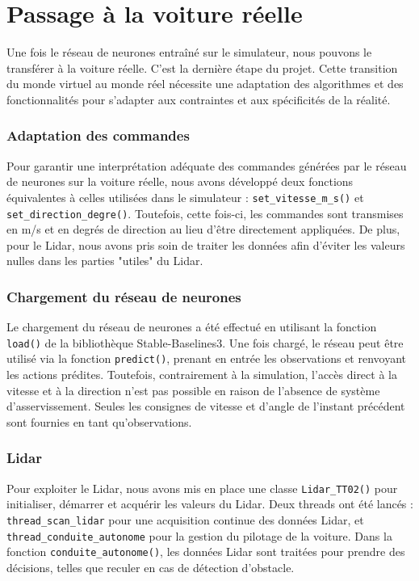\documentclass[french]{article}
\begin{document}
\section*{Passage à la voiture réelle}
Une fois le réseau de neurones entraîné sur le simulateur, nous pouvons le transférer à la voiture réelle. C'est 
la dernière étape du projet. Cette transition du monde virtuel au monde réel nécessite une adaptation des algorithmes 
et des fonctionnalités pour s'adapter aux contraintes et aux spécificités de la réalité.

\subsubsection*{Adaptation des commandes}
Pour garantir une interprétation adéquate des commandes générées par le réseau de neurones sur la voiture réelle,
nous avons développé deux fonctions équivalentes à celles utilisées dans le simulateur : \texttt{set\_vitesse\_m\_s()} 
et \texttt{set\_direction\_degre()}. Toutefois, cette fois-ci, les commandes sont transmises en m/s et en degrés de 
direction au lieu d'être directement appliquées. De plus, pour le Lidar, nous avons pris soin de traiter les données 
afin d'éviter les valeurs nulles dans les parties "utiles" du Lidar.


\subsubsection*{Chargement du réseau de neurones}
Le chargement du réseau de neurones a été effectué en utilisant la fonction \texttt{load()} de la bibliothèque 
Stable-Baselines3. Une fois chargé, le réseau peut être utilisé via la fonction \texttt{predict()}, prenant en 
entrée les observations et renvoyant les actions prédites. Toutefois, contrairement à la simulation, l'accès direct 
à la vitesse et à la direction n'est pas possible en raison de l'absence de système d'asservissement. Seules les 
consignes de vitesse et d'angle de l'instant précédent sont fournies en tant qu'observations.

\subsubsection*{Lidar}
Pour exploiter le Lidar, nous avons mis en place une classe \texttt{Lidar\_TT02()} pour initialiser, démarrer 
et acquérir les valeurs du Lidar. Deux threads ont été lancés : \texttt{thread\_scan\_lidar} pour une acquisition 
continue des données Lidar, et \texttt{thread\_conduite\_autonome} pour la gestion du pilotage de la voiture. 
Dans la fonction \texttt{conduite\_autonome()}, les données Lidar sont traitées pour prendre des décisions, 
telles que reculer en cas de détection d'obstacle.
\end{document}
